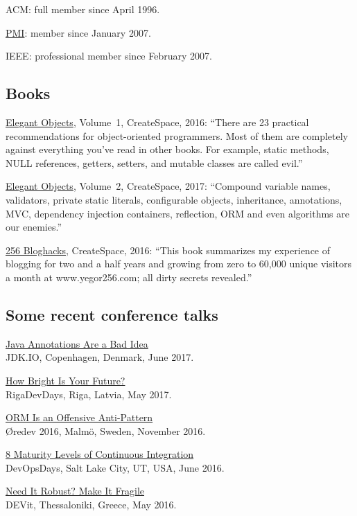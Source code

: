 \documentclass[12pt]{article}
\begin{document}
ACM: full member since April 1996.

\href{https://certification.pmi.org/registry.aspx}{PMI}: member since January 2007.

IEEE: professional member since February 2007.

\subsection*{Books}

\href{https://amzn.to/2E5UHqZ}{Elegant Objects}, Volume~1, CreateSpace, 2016:
``There are 23 practical recommendations for object-oriented programmers. Most of them are completely
against everything you've read in other books.
For example, static methods, NULL references, getters, setters, and
mutable classes are called evil.''

\href{https://amzn.to/2J2s5T4}{Elegant Objects}, Volume~2, CreateSpace, 2017:
``Compound variable names, validators, private static literals, configurable objects, inheritance,
annotations, MVC, dependency injection containers, reflection, ORM and even algorithms are our enemies.''

\href{https://amzn.to/2GkuyXf}{256 Bloghacks}, CreateSpace, 2016:
``This book summarizes my experience of blogging for two and a half years and growing from zero to 60,000
unique visitors a month at www.yegor256.com; all dirty secrets revealed.''

\subsection*{Some recent conference talks}

\href{https://youtu.be/cv23Z6xpwDw}{Java Annotations Are a Bad Idea}\\
JDK.IO, Copenhagen, Denmark, June 2017.

\href{https://www.youtube.com/watch?v=IGbteQpTNCA}{How Bright Is Your Future?}\\
RigaDevDays, Riga, Latvia, May 2017.

\href{https://www.youtube.com/watch?v=03PXmPc7Q3g}{ORM Is an Offensive Anti-Pattern}\\
\O{}redev 2016, Malm\"o, Sweden, November 2016.

\href{https://www.youtube.com/watch?v=3dJP_LtUGgg}{8 Maturity Levels of Continuous Integration}\\
DevOpsDays, Salt Lake City, UT, USA, June 2016.

\href{https://www.youtube.com/watch?v=nCGBgI1MNwE}{Need It Robust? Make It Fragile}\\
DEVit, Thessaloniki, Greece, May 2016.
\end{document}
